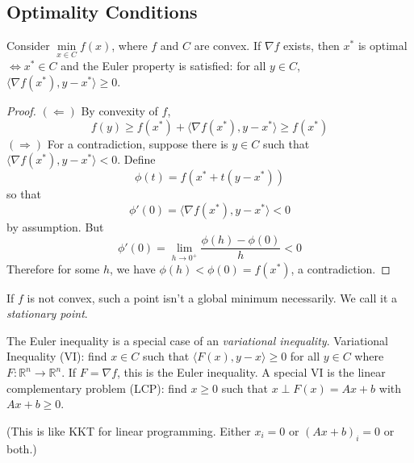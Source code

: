 \documentclass[english, 11pt]{article}
\begin{document}
\subsection{Optimality Conditions}
\begin{thrm}
Consider $\min \limits_{x \in C} f(x)$, where $f$ and $C$ are convex. 
If $\nabla f$ exists, then $x^*$ is optimal $\iff x^* \in C$ and the Euler property is satisfied: for all $y \in C$, $\langle \nabla f(x^*), y - x^* \rangle \ge 0$.
\end{thrm}
\begin{proof}
$(\Leftarrow)$ By convexity of $f$, 
\[
f(y) \ge f(x^*) + \langle \nabla f(x^*), y - x^* \rangle \ge f(x^*)
\]
$(\Rightarrow)$ For a contradiction, suppose there is $y \in C$ such that $\langle \nabla f(x^*) , y - x^* \rangle <0$. Define 
\[
\phi(t) =
f(x^* + t(y-x^*))
\]
so that 
\[
\phi'(0) = \langle \nabla f(x^*), y - x^* \rangle <0
\]
by assumption. But 
\[
\phi'(0) = \lim \limits_{h \to 0^+} \frac{\phi(h) - \phi(0) }{h} < 0
\]
Therefore for some $h$, we have $\phi(h) < \phi(0) =f(x^*)$, a contradiction.
\end{proof}


\begin{rem}
If $f$ is not convex, such a point isn't a global minimum necessarily. We call it a {\it stationary point}.
\end{rem}

\begin{rem}
The Euler inequality is a special case of an {\it variational inequality}. Variational Inequality (VI): find $x \in C$ such that $\langle F(x), y-x \rangle \ge 0$ for all $y \in C$ where $F : \mathbb{R}^n \to \mathbb{R}^n$. If $F = \nabla f$, this is the Euler inequality. A special VI is the linear complementary problem (LCP): find $x \ge 0$ such that $x \perp F(x) = Ax+b$ with $Ax+b \ge 0$.

(This is like KKT for linear programming. Either $x_i =0$ or $(Ax+b)_i = 0$ or both.)
\end{rem}
\end{document}
